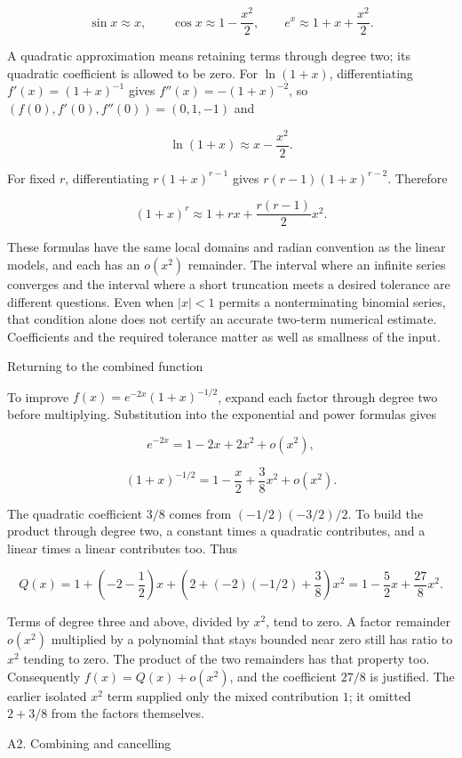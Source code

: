 \documentclass[
  11pt,
]{article}
\providecommand{\lt}{<}
\begin{document}
\[\sin x\approx x,\qquad \cos x\approx1-\frac{x^2}{2},\qquad e^x\approx1+x+\frac{x^2}{2}.\]

A quadratic approximation means retaining terms through degree two; its
quadratic coefficient is allowed to be zero. For \(\ln(1+x)\),
differentiating \(f'(x)=(1+x)^{-1}\) gives \(f''(x)=-(1+x)^{-2}\), so
\((f(0),f'(0),f''(0))=(0,1,-1)\) and

\[\ln(1+x)\approx x-\frac{x^2}{2}.\]

For fixed \(r\), differentiating \(r(1+x)^{r-1}\) gives
\(r(r-1)(1+x)^{r-2}\). Therefore

\[(1+x)^r\approx1+rx+\frac{r(r-1)}2x^2.\]

These formulas have the same local domains and radian convention as the
linear models, and each has an \(o(x^2)\) remainder. The interval where
an infinite series converges and the interval where a short truncation
meets a desired tolerance are different questions. Even when
\(|x|\lt 1\) permits a nonterminating binomial series, that condition
alone does not certify an accurate two-term numerical estimate.
Coefficients and the required tolerance matter as well as smallness of
the input.

Returning to the combined function

To improve \(f(x)=e^{-2x}(1+x)^{-1/2}\), expand each factor through
degree two before multiplying. Substitution into the exponential and
power formulas gives

\[e^{-2x}=1-2x+2x^2+o(x^2),\]

\[(1+x)^{-1/2}=1-\frac{x}{2}+\frac38x^2+o(x^2).\]

The quadratic coefficient \(3/8\) comes from \((-1/2)(-3/2)/2\). To
build the product through degree two, a constant times a quadratic
contributes, and a linear times a linear contributes too. Thus

\[Q(x)=1+\left(-2-\frac12\right)x+\left(2+(-2)(-1/2)+\frac38\right)x^2
=1-\frac52x+\frac{27}{8}x^2.\]

Terms of degree three and above, divided by \(x^2\), tend to zero. A
factor remainder \(o(x^2)\) multiplied by a polynomial that stays
bounded near zero still has ratio to \(x^2\) tending to zero. The
product of the two remainders has that property too. Consequently
\(f(x)=Q(x)+o(x^2)\), and the coefficient \(27/8\) is justified. The
earlier isolated \(x^2\) term supplied only the mixed contribution
\(1\); it omitted \(2+3/8\) from the factors themselves.

A2. Combining and cancelling
\end{document}
